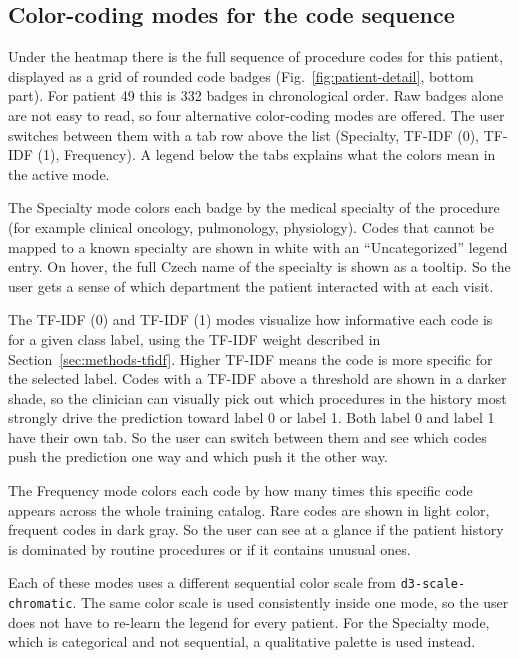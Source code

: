 \subsection{Color-coding modes for the code sequence}
\label{sec:results-catalog-colors}

Under the heatmap there is the full sequence of procedure codes for this patient, displayed as a grid of rounded code badges (Fig.~\ref{fig:patient-detail}, bottom part). For patient 49 this is 332 badges in chronological order. Raw badges alone are not easy to read, so four alternative color-coding modes are offered. The user switches between them with a tab row above the list (Specialty, TF-IDF (0), TF-IDF (1), Frequency). A legend below the tabs explains what the colors mean in the active mode.

The Specialty mode colors each badge by the medical specialty of the procedure (for example clinical oncology, pulmonology, physiology). Codes that cannot be mapped to a known specialty are shown in white with an ``Uncategorized'' legend entry. On hover, the full Czech name of the specialty is shown as a tooltip. So the user gets a sense of which department the patient interacted with at each visit.

The TF-IDF (0) and TF-IDF (1) modes visualize how informative each code is for a given class label, using the TF-IDF weight described in Section~\ref{sec:methods-tfidf}. Higher TF-IDF means the code is more specific for the selected label. Codes with a TF-IDF above a threshold are shown in a darker shade, so the clinician can visually pick out which procedures in the history most strongly drive the prediction toward label 0 or label 1. Both label 0 and label 1 have their own tab. So the user can switch between them and see which codes push the prediction one way and which push it the other way.

The Frequency mode colors each code by how many times this specific code appears across the whole training catalog. Rare codes are shown in light color, frequent codes in dark gray. So the user can see at a glance if the patient history is dominated by routine procedures or if it contains unusual ones.

Each of these modes uses a different sequential color scale from \texttt{d3-scale-chromatic}. The same color scale is used consistently inside one mode, so the user does not have to re-learn the legend for every patient. For the Specialty mode, which is categorical and not sequential, a qualitative palette is used instead.

